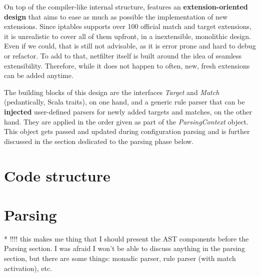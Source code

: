 On top of the compiler-like internal structure, \TOOL features an
\textbf{extension-oriented design} that aims to ease as much as possible the
implementation of new extensions. Since iptables supports over 100 official
match and target extensions, it is unrealistic to cover all of them upfront, in
a inextensible, monolithic design.  Even if we could, that is still not
advisable, as it is error prone and hard to debug or refactor.  To add to that,
netfilter itself is built around the idea of seamless extensibility.
Therefore, while it does not happen to often, new, fresh extensions can be
added anytime.

The building blocks of this design are the interfaces \emph{Target} and
\emph{Match} (pedantically, Scala traits), on one hand, and a generic rule
parser that can be \textbf{injected} user-defined parsers for newly added
targets and matches, on the other hand.  They are applied in the order given as
part of the \emph{ParsingContext} object.  This object gets passed and updated
during configuration parsing and is further discussed in the section dedicated
to the parsing phase below.


\section{Code structure}



\section{Parsing}
* !!!! this makes me thing that I should present the AST components before the
Parsing section.  I was afraid I won't be able to discuss anything in the
parsing section, but there are some things: monadic parser, rule parser (with
match activation), etc.


